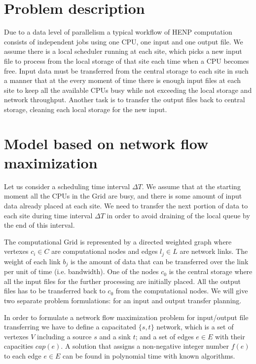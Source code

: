 \documentclass{svjour3}                     %
\begin{document}
\section{Problem description}
\label{problem}
Due to a data level of parallelism a typical workflow of HENP computation
consists of independent jobs using one CPU, one input and one output file. We
assume there is a local scheduler running at each site, which picks a new
input file to process from the local storage of that site each time when a CPU becomes
free. Input data must be transferred from the central storage
to each site in such a manner that at the every moment of time there is enough
input files at each site to keep all the available CPUs busy while not
exceeding the local storage and network throughput. Another task
is to transfer the output files back to central storage, cleaning each local
storage for the new input.

\section{Model based on network flow maximization}
\label{modeling}
Let us consider a scheduling time interval $\Delta T$. We assume that at the
starting moment all the CPUs in the Grid are busy, and there is some amount of
input data already placed at each site. We need to transfer the next portion
of data to each site during time interval $\Delta T$ in order to avoid
draining of the local queue by the end of this interval. 

The computational Grid is represented by a directed weighted graph where
vertexes $c_{i} \in C$ are computational nodes and edges $l_{j} \in L$ are
network links. The weight of each link $b_{j}$ is the amount of data that can be
transferred over the link per unit of time (i.e. bandwidth). One of the nodes
$c_{0}$ is the central storage where all the input files for the further
processing are initially placed. All the output files has to be transferred
back to $c_{0}$ from the computational nodes. We will give two separate
problem formulations: for an input and output transfer planning. 

In order to formulate a network flow maximization problem \cite{Network_flows}
for input/output file transferring we have to define a capacitated $\{s,t\}$
network, which is a set of vertexes $V$ including a source $s$ and a sink $t$;
and a set of edges $e\in E$ with their capacities $cap(e)$. A solution that
assigns a non-negative integer number $f(e)$ to each edge $e \in E$ can be
found in polynomial time with known algorithms.
\end{document}
